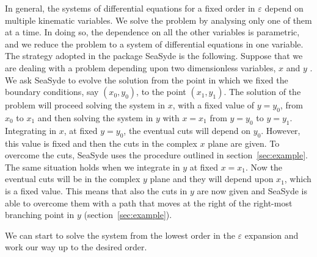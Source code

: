 \documentclass[final,1p,times]{elsarticle}
\begin{document}
In general, the systems of differential equations for a fixed order in $\varepsilon$ depend on multiple kinematic variables. We solve the problem by analysing only one of them at a time. 
In doing so, the dependence on all the other variables is parametric, and we reduce the problem to a system of differential equations in one variable.
The strategy adopted in  the package {\sc SeaSyde} is the following. Suppose that we are dealing with a problem depending upon two dimensionless variables, $x$ and $y$ . We ask {\sc SeaSyde} to evolve the solution from the point in which we fixed the boundary conditions, say $(x_0,y_0)$, to the point $(x_1,y_1)$. The solution of the problem will proceed solving the system in $x$, with a fixed value of $y=y_0$, from $x_0$ to $x_1$ and then solving the system in $y$ with $x=x_1$ from $y=y_0$ to $y=y_1$.
Integrating in $x$, at fixed $y=y_0$, the eventual cuts will depend on $y_0$. However, this value is fixed and then the cuts in the complex $x$ plane are given. To overcome the cuts, {\sc SeaSyde} uses the procedure outlined in section~\ref{sec:example}.
The same situation holds when we integrate in $y$ at fixed $x=x_1$. Now the eventual cuts will be in the complex $y$ plane and they will depend upon $x_1$, which is a fixed value. This means that also the cuts in $y$ are now given and {\sc SeaSyde} is able to overcome them with a path that moves at the right of the right-most branching point in $y$ (section~\ref{sec:example}).










We can start to solve the system from the lowest order in the $\varepsilon$ expansion and work our way up to the desired order.
\end{document}
